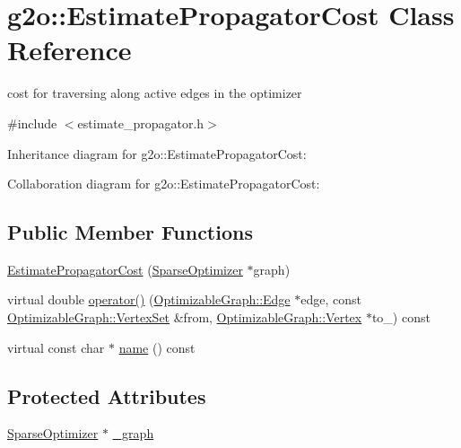 \hypertarget{classg2o_1_1EstimatePropagatorCost}{}\section{g2o\+:\+:Estimate\+Propagator\+Cost Class Reference}
\label{classg2o_1_1EstimatePropagatorCost}


cost for traversing along active edges in the optimizer  




{\ttfamily \#include $<$estimate\+\_\+propagator.\+h$>$}



Inheritance diagram for g2o\+:\+:Estimate\+Propagator\+Cost\+:


Collaboration diagram for g2o\+:\+:Estimate\+Propagator\+Cost\+:
\subsection*{Public Member Functions}
\begin{DoxyCompactItemize}
\item 
\hyperlink{classg2o_1_1EstimatePropagatorCost_aebd56e3597a99b225bc3799ec8145bc9}{Estimate\+Propagator\+Cost} (\hyperlink{classg2o_1_1SparseOptimizer}{Sparse\+Optimizer} $\ast$graph)
\item 
virtual double \hyperlink{classg2o_1_1EstimatePropagatorCost_abbff40e061153f9049a40514c44b4492}{operator()} (\hyperlink{classg2o_1_1OptimizableGraph_1_1Edge}{Optimizable\+Graph\+::\+Edge} $\ast$edge, const \hyperlink{classg2o_1_1HyperGraph_a703938cdb4bb636860eed55a2489d70c}{Optimizable\+Graph\+::\+Vertex\+Set} \&from, \hyperlink{classg2o_1_1OptimizableGraph_1_1Vertex}{Optimizable\+Graph\+::\+Vertex} $\ast$to\+\_\+) const 
\item 
virtual const char $\ast$ \hyperlink{classg2o_1_1EstimatePropagatorCost_a302b70a2b5d83d4ae5863f4b88742589}{name} () const 
\end{DoxyCompactItemize}
\subsection*{Protected Attributes}
\begin{DoxyCompactItemize}
\item 
\hyperlink{classg2o_1_1SparseOptimizer}{Sparse\+Optimizer} $\ast$ \hyperlink{classg2o_1_1EstimatePropagatorCost_adf778ed8de5b54eb934e88107fe77980}{\+\_\+graph}
\end{DoxyCompactItemize}


